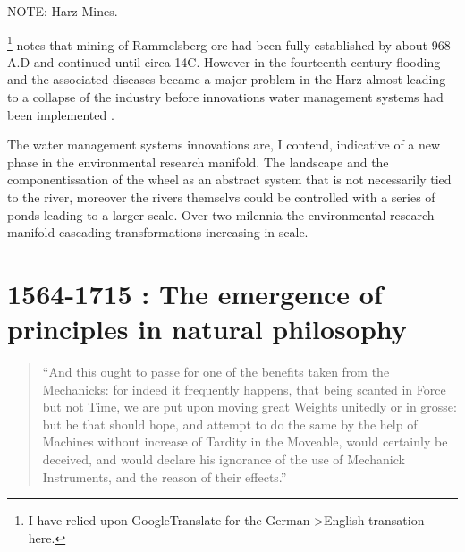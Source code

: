 \documentclass[a4paper, 12pt]{article}
\begin{document}





NOTE: Harz Mines.

\citeauthor{monna_pb_2000}\footnote{I have relied upon GoogleTranslate for the German->English transation here.} notes that mining of Rammelsberg ore had been fully established by about 968 A.D and continued until circa 14C. However in the fourteenth century flooding and the associated diseases became a major problem in the Harz almost leading to a collapse of the industry before innovations water management systems had been implemented \citep[p.~1]{monna_pb_2000}. 

The water management systems innovations are, I contend, indicative of a new phase in the environmental research manifold. The landscape and the componentissation of the wheel as an abstract system that is not necessarily tied to the river, moreover the rivers themselvs could be controlled with a series of ponds leading to a larger scale. Over two milennia the environmental research manifold cascading transformations increasing in scale. 


\section{1564-1715 \CE: The emergence of principles in natural philosophy}
\label{sec:emerge:principle}

\begin{quotation}
        ``And this ought to passe for one of the benefits taken from the Mechanicks: for indeed it frequently happens, that being scanted in Force but not Time, we are put upon moving great Weights unitedly or in grosse: but he that should hope, and attempt to do the same by the help of Machines without increase of Tardity in the Moveable, would certainly be deceived, and would declare his ignorance of the use of Mechanick Instruments, and the reason of their effects.''
        \citet[p.~3]{galilei_mechanics_1665}
\end{quotation}
\end{document}
